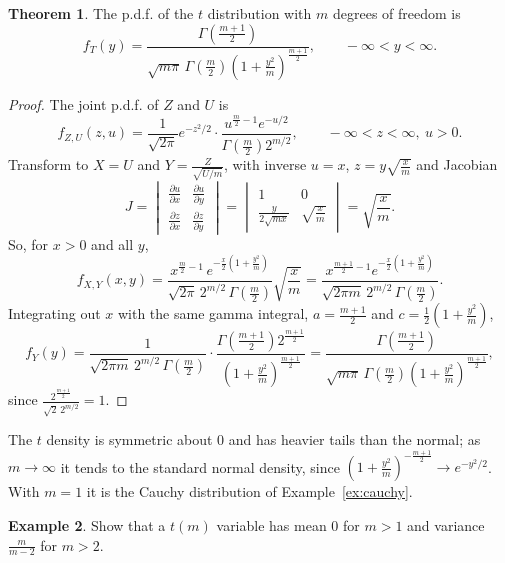 \documentclass[12pt,a4paper]{report}
\theoremstyle{definition}
\newtheorem{thm}{Theorem}[section]
\newtheorem{example}[thm]{Example}
\theoremstyle{plain}
\begin{document}
\begin{thm}
\label{thm:tdensity}
The p.d.f. of the $t$ distribution with $m$ degrees of freedom is
\[f_T(y) = \frac{\Gamma \left(\frac{m + 1}{2}\right)}{\sqrt{m\pi}\,
\Gamma\left(\frac{m}{2}\right)\left(1 + \frac{y^2}{m}\right)^{\frac{m+1}{2}}}
,\qquad -\infty<y<\infty .\]
\end{thm}

\begin{proof}
The joint p.d.f. of $Z$ and $U$ is
\[f_{Z,U}(z,u) = \frac{1}{\sqrt{2\pi}}e^{-z^2/2}\cdot\frac{u^{\frac{m}{2}-1}
e^{-u/2}}{\Gamma \left(\frac{m}{2}\right) 2^{m/2}} ,\qquad -\infty<z<\infty,\
u>0 .\]
Transform to $X = U$ and $Y = \frac{Z}{\sqrt{U/m}}$, with inverse $u = x$,
$z = y\sqrt{\frac{x}{m}}$ and Jacobian
\[J = \begin{vmatrix}
\frac{\partial u}{\partial x} & \frac{\partial u}{\partial y}\\[1ex]
\frac{\partial z}{\partial x} & \frac{\partial z}{\partial y}
\end{vmatrix} = \begin{vmatrix}
1 & 0 \\
\frac{y}{2\sqrt{mx}} & \sqrt{\frac{x}{m}}
\end{vmatrix} = \sqrt{\frac{x}{m}} .\]
So, for $x>0$ and all $y$,
\[f_{X,Y}(x,y) = \frac{x^{\frac{m}{2}-1}\, e^{-\frac{x}{2}\left(1 +
\frac{y^2}{m}\right)}}{\sqrt{2\pi}\, 2^{m/2}\, \Gamma \left(\frac{m}{2}\right)}
\sqrt{\frac{x}{m}} = \frac{x^{\frac{m+1}{2} - 1}e^{-\frac{x}{2}\left(1 +
\frac{y^2}{m}\right)}}{\sqrt{2\pi m}\, 2^{m/2}\, \Gamma \left(\frac{m}{2}\right)} .\]
Integrating out $x$ with the same gamma integral, $a = \frac{m+1}{2}$ and
$c = \frac12\left(1 + \frac{y^2}{m}\right)$,
\[f_Y(y) = \frac{1}{\sqrt{2\pi m}\, 2^{m/2}\, \Gamma \left(\frac{m}{2}\right)}\cdot
\frac{\Gamma\left(\frac{m+1}{2}\right)2^{\frac{m+1}{2}}}{\left(1 +
\frac{y^2}{m}\right)^{\frac{m+1}{2}}} = \frac{\Gamma \left(\frac{m +
1}{2}\right)}{\sqrt{m \pi}\, \Gamma \left(\frac{m}{2}\right)\left(1 +
\frac{y^2}{m}\right)^{\frac{m+1}{2}}} ,\]
since $\frac{2^{\frac{m+1}{2}}}{\sqrt{2}\,2^{m/2}} = 1$.
\end{proof}

The $t$ density is symmetric about $0$ and has heavier tails than the normal; as
$m\to\infty$ it tends to the standard normal density, since
$\left(1 + \frac{y^2}{m}\right)^{-\frac{m+1}{2}}\to e^{-y^2/2}$. With $m = 1$ it
is the Cauchy distribution of Example~\ref{ex:cauchy}.

\begin{example}
\label{ex:tmoments}
Show that a $t(m)$ variable has mean $0$ for $m>1$ and variance
$\frac{m}{m - 2}$ for $m>2$.
\end{example}
\end{document}
